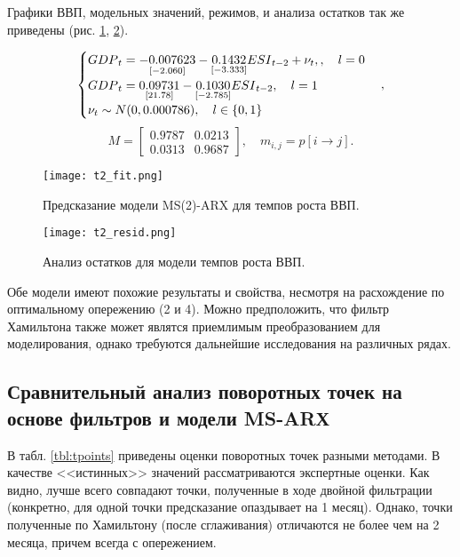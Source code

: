 \documentclass[a4paper,14pt]{extreport}
\begin{document}
	Графики ВВП, модельных значений, режимов, и анализа остатков так же приведены (рис. \ref{fig:hp-fitcompare2}, \ref{fig:hp-residcompare2}).
	
	
	{
		\begin{equation}
		\begin{cases}
		{GDP}_{t} = 
		\underset{[-2.060]}{-0.007623} 
		- \underset{[-3.333]}{0.1432} {ESI}_{t-2}
		+ \nu_{t} , \space 
		, \quad l=0 \\
		{GDP}_{t} = 
		\underset{[21.78]}{0.09731}
		- \underset{[-2.785]}{0.1030} {ESI}_{t-2}
		, \quad l=1 \\
		\nu_{t} \sim N(0, 0.000786) , \quad l \in \{0, 1\}
		\end{cases},
		\label{eq:ms2varx}
		\end{equation}
		\begin{equation}
		M = 
		\begin{bmatrix}
		0.9787 & 0.0213 \\
		0.0313 & 0.9687
		\end{bmatrix}
		, \quad m_{i,j} = p[i \rightarrow j]
		.
		\label{eq:ms2varx_m}
		\end{equation}		
	}
	
	{
		\begin{figure}
			\texttt{[image: t2\_fit.png]}
			\caption{Предсказание модели MS(2)-ARX для темпов роста ВВП.}
			\label{fig:hp-fitcompare2}
		\end{figure}
		\begin{figure}
			\texttt{[image: t2\_resid.png]}
			\caption{Анализ остатков для модели темпов роста ВВП.}
			\label{fig:hp-residcompare2}
		\end{figure}
	}
	
	
	Обе модели имеют похожие результаты и свойства, несмотря на расхождение по оптимальному опережению (2 и 4). Можно предположить, что фильтр Хамильтона также может являтся приемлимым преобразованием для моделирования, однако требуются дальнейшие исследования на различных рядах.
	
	
	\subsection{Сравнительный анализ поворотных точек на основе фильтров и модели MS-ARХ}
	
	
	В табл. \ref{tbl:tpoints} приведены оценки поворотных точек разными методами. В качестве <<истинных>> значений рассматриваются экспертные оценки. Как видно, лучше всего совпадают точки, полученные в ходе двойной фильтрации (конкретно, для одной точки предсказание опаздывает на 1 месяц). Однако, точки полученные по Хамильтону (после сглаживания) отличаются не более чем на 2 месяца, причем всегда с опережением.
	
\end{document}
